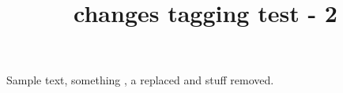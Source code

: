 \documentclass{article}
\title{changes tagging test - 2}
\begin{document}
Sample text, something , a 
replaced and  stuff removed.
    \listofchanges
\end{document}
